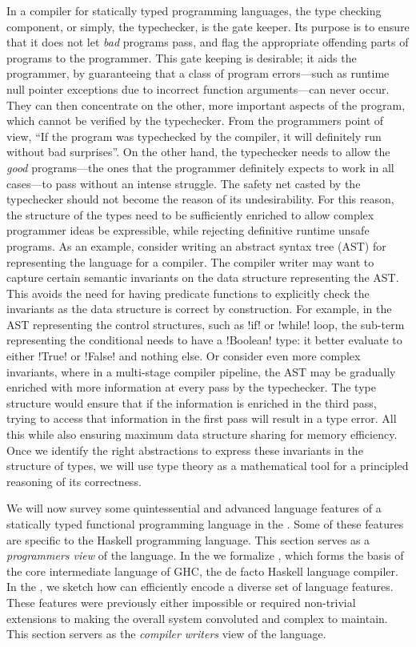 \documentclass[screen,nonacm]{acmart}
\begin{document}
In a compiler for statically typed programming languages, the type
checking component, or simply, the typechecker, is the gate
keeper. Its purpose is to ensure that it does not let \emph{bad}
programs pass, and flag the appropriate offending parts of programs to
the programmer. This gate keeping is desirable; it aids the programmer,
by guaranteeing that a class of program errors---such as runtime null
pointer exceptions due to incorrect function arguments---can never
occur. They can then concentrate on the other, more important aspects
of the program, which cannot be verified by the typechecker.
From the programmers point of view, ``If the program was typechecked
by the compiler, it will definitely run without bad surprises''.
On the other hand, the typechecker needs to allow
the \emph{good} programs---the ones that the programmer definitely
expects to work in all cases---to pass without an intense struggle.
The safety net casted by the typechecker should not become the reason
of its undesirability. For this reason, the structure of the types need to be
sufficiently enriched to allow complex programmer ideas be expressible,
while rejecting definitive runtime unsafe programs.
As an example, consider writing an abstract syntax tree (AST) for representing the
language for a compiler. The compiler writer may want to capture certain semantic
invariants on the data structure representing the AST. This avoids the
need for having predicate functions to explicitly check the invariants
as the data structure is correct by construction. For example, in the
AST representing the control structures, such as !if! or !while!
loop, the sub-term representing the conditional needs to have a
!Boolean! type: it better evaluate to either !True! or
!False! and nothing else. Or consider even more complex invariants, where in a
multi-stage compiler pipeline, the AST may be gradually enriched with
more information at every pass by the typechecker. The type structure
would ensure that if the
information is enriched in the third pass, trying to
access that information in the first pass will result in a
type error. All this while also ensuring maximum data structure
sharing for memory efficiency\cite{peyton_jones_trees_2017}. Once we
identify the right abstractions to express these invariants in
the structure of types, we will use type theory as a mathematical tool
for a principled reasoning of its correctness.


We will now survey some quintessential
and advanced language features of a statically typed
functional programming language in the .
Some of these features are specific to the Haskell programming language.
This section serves as a \emph{programmers view} of the language.
In the  we formalize \SFC, which
forms the basis of the core intermediate language
of GHC, the de facto Haskell language compiler.
In the , we sketch how \SFC
can efficiently encode a diverse set of language features.
These features were previously either impossible or required non-trivial extensions
to \SF making the overall system convoluted and complex to maintain.
This section servers as the \emph{compiler writers} view of the
language.
\end{document}
